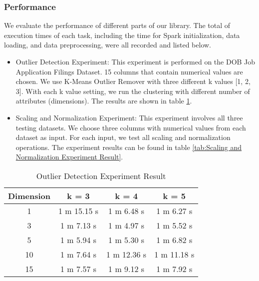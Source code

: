 \documentclass[sigconf]{acmart}
\begin{document}
\subsubsection{Performance} We evaluate the performance of different parts of our library. The total of execution times of each task, including the time for Spark initialization, data loading, and data preprocessing, were all recorded and listed below.
\begin{itemize}
	\item{Outlier Detection Experiment}: This experiment is performed on the DOB Job Application Filings Dataset. 15 columns that contain numerical values are chosen. We use K-Means Outlier Remover with three different k values [1, 2, 3]. With each k value setting, we run the clustering with different number of attributes (dimensions). The results are shown in table \ref{tab:Outlier Detection Experiment Result}.
	\item{Scaling and Normalization Experiment}: This experiment involves all three testing datasets. We choose three columns with numerical values from each dataset as input. For each input, we test all scaling and normalization operations. The experiment results can be found in table \ref{tab:Scaling and Normalization Experiment Result}.
\end{itemize}

\begin{table}
\caption{Outlier Detection Experiment Result}   
\label{tab:Outlier Detection Experiment Result}
\begin{tabular}{cccc}   
Dimension  &  k = 3  &  k = 4  & k = 5  \\  
\hline
1   & 1 m 15.15 s  & 1 m 6.48 s   & 1 m 6.27 s             \\ 
3   & 1 m 7.13 s    & 1 m 4.97 s   & 1 m 5.52 s             \\  
5   & 1 m 5.94 s    & 1 m 5.30 s   & 1 m 6.82 s             \\ 
10 & 1 m 7.64 s    & 1 m 12.36 s & 1 m 11.18 s           \\ 
15 & 1 m 7.57 s    & 1 m 9.12 s   & 1 m 7.92 s             \\ 

\end{tabular}   
\end{table}
\end{document}
